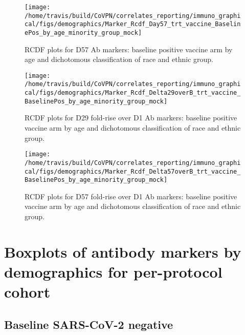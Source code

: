\documentclass[]{book}
\theoremstyle{definition}
\theoremstyle{definition}
\theoremstyle{definition}
\newcommand{\1}{\mathbbm{1}}
\begin{document}
\clearpage
\begin{figure}[H]

{\centering \texttt{[image: /home/travis/build/CoVPN/correlates\_reporting/immuno\_graphical/figs/demographics/Marker\_Rcdf\_Day57\_trt\_vaccine\_BaselinePos\_by\_age\_minority\_group\_mock]} 

}

\caption{RCDF plots for D57 Ab markers: baseline positive vaccine arm by age and dichotomous classification of race and ethnic group.}\label{fig:unnamed-chunk-125}
\end{figure}

\clearpage
\begin{figure}[H]

{\centering \texttt{[image: /home/travis/build/CoVPN/correlates\_reporting/immuno\_graphical/figs/demographics/Marker\_Rcdf\_Delta29overB\_trt\_vaccine\_BaselinePos\_by\_age\_minority\_group\_mock]} 

}

\caption{RCDF plots for D29 fold-rise over D1 Ab markers: baseline positive vaccine arm by age and dichotomous classification of race and ethnic group.}\label{fig:unnamed-chunk-126}
\end{figure}

\clearpage
\begin{figure}[H]

{\centering \texttt{[image: /home/travis/build/CoVPN/correlates\_reporting/immuno\_graphical/figs/demographics/Marker\_Rcdf\_Delta57overB\_trt\_vaccine\_BaselinePos\_by\_age\_minority\_group\_mock]} 

}

\caption{RCDF plots for D57 fold-rise over D1 Ab markers: baseline positive vaccine arm by age and dichotomous classification of race and ethnic group.}\label{fig:unnamed-chunk-127}
\end{figure}

\clearpage

\hypertarget{boxplots-of-antibody-markers-by-demographics-for-per-protocol-cohort}{%
\section{Boxplots of antibody markers by demographics for per-protocol cohort}\label{boxplots-of-antibody-markers-by-demographics-for-per-protocol-cohort}}

\hypertarget{baseline-sars-cov-2-negative-5}{%
\subsection{Baseline SARS-CoV-2 negative}\label{baseline-sars-cov-2-negative-5}}
\end{document}

